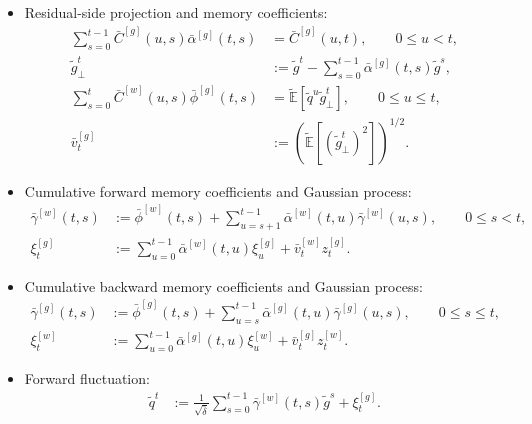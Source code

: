 \begin{definition}
\begin{itemize}[wide]
    \item Residual-side projection and memory coefficients:
    \begin{align}
    \sum_{s=0}^{t-1}
        \bar C^{[g]}(u,s)\bar\alpha^{[g]}(t,s)
    &=
    \bar C^{[g]}(u,t),
    \qquad 0\le u<t,
    \label{eq:alpha-g-definition}
    \\[-7pt]
    \tilde g_\perp^t
    &:=
    \tilde g^t
    -
    \sum_{s=0}^{t-1}
        \bar\alpha^{[g]}(t,s)\tilde g^s,
    \\[-7pt]
    \sum_{s=0}^{t}
        \bar C^{[w]}(u,s)\bar\phi^{[g]}(t,s)
    &=
    \tilde{\mathbb E}
    [
        \tilde q^u\tilde g_\perp^t
    ],
    \qquad 0\le u\le t,
    \label{eq:phi-g-definition}
    \\[-7pt]
    \bar v_t^{[g]}
    &:=
    \left(
        \tilde{\mathbb E}
        [
            (\tilde g_\perp^t)^2
        ]
    \right)^{1/2}.
\end{align}

    \item Cumulative forward memory coefficients and Gaussian process:
    \begin{align}
    \bar\gamma^{[w]}(t,s)
    &:=
    \bar\phi^{[w]}(t,s)
    +
    \sum_{u=s+1}^{t-1}
        \bar\alpha^{[w]}(t,u)
        \bar\gamma^{[w]}(u,s),
    \qquad 0\le s<t,
    \\[-7pt]
    \xi_t^{[g]}
    &:=
    \sum_{u=0}^{t-1}
        \bar\alpha^{[w]}(t,u)\xi_u^{[g]}
    +
    \bar v_t^{[w]}z_t^{[g]}.
    \label{eq:xi-g-definition}
\end{align}

    \item Cumulative backward memory coefficients and Gaussian process:
\begin{align}
    \bar\gamma^{[g]}(t,s)
    &:=
    \bar\phi^{[g]}(t,s)
    +
    \sum_{u=s}^{t-1}
        \bar\alpha^{[g]}(t,u)
        \bar\gamma^{[g]}(u,s),
    \qquad 0\le s\le t,
    \label{eq:Gamma-g-definition}
    \\[-7pt]
    \xi_t^{[w]}
    &:=
    \sum_{u=0}^{t-1}
        \bar\alpha^{[g]}(t,u)\xi_u^{[w]}
    +
    \bar v_t^{[g]}z_t^{[w]}.
    \label{eq:xi-w-definition}
\end{align}

\item Forward fluctuation:
\vspace{-21pt}
\begin{align}
    \tilde q^t
    &:=
    \frac{1}{\sqrt{\bar\delta}}
    \sum_{s=0}^{t-1}
        \bar\gamma^{[w]}(t,s)\tilde g^s
    +
    \xi_t^{[g]}.
    \label{eq:q-memory-definition}
\end{align}


\end{itemize}
\end{definition}
